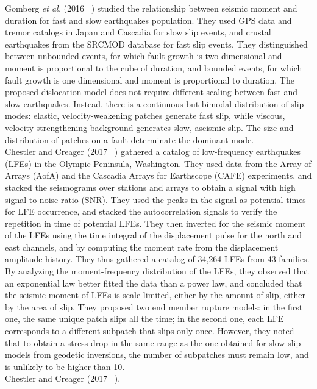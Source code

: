 \documentclass[main.tex]{subfiles}
\begin{document}
Gomberg \textit{et al.} (2016 ~\cite{GOM_2016_GRL}) studied the relationship between seismic moment and duration for fast and slow earthquakes population. They used GPS data and tremor catalogs in Japan and Cascadia for slow slip events, and crustal earthquakes from the SRCMOD database for fast slip events. They distinguished between unbounded events, for which fault growth is two-dimensional and moment is proportional to the cube of duration, and bounded events, for which fault growth is one dimensional and moment is proportional to duration. The proposed dislocation model does not require different scaling between fast and slow earthquakes. Instead, there is a continuous but bimodal distribution of slip modes: elastic, velocity-weakening patches generate fast slip, while viscous, velocity-strengthening background generates slow, aseismic slip. The size and distribution of patches on a fault determinate the dominant mode. \\

Chestler and Creager (2017 ~\cite{CHE_2017_JGR}) gathered a catalog of low-frequency earthquakes (LFEs) in the Olympic Peninsula, Washington. They used data from the Array of Arrays (AofA) and the Cascadia Arrays for Earthscope (CAFE) experiments, and stacked the seismograms over stations and arrays to obtain a signal with high signal-to-noise ratio (SNR). They used the peaks in the signal as potential times for LFE occurrence, and stacked the autocorrelation signals to verify the repetition in time of potential LFEs. They then inverted for the seismic moment of the LFEs using the time integral of the displacement pulse for the north and east channels, and by computing the moment rate from the displacement amplitude history. They thus gathered a catalog of 34,264 LFEs from 43 families. By analyzing the moment-frequency distribution of the LFEs, they observed that an exponential law better fitted the data than a power law, and concluded that the seismic moment of LFEs is scale-limited, either by the amount of slip, either by the area of slip. They proposed two end member rupture models: in the first one, the same unique patch slips all the time; in the second one, each LFE corresponds to a different subpatch that slips only once. However, they noted that to obtain a stress drop in the same range as the one obtained for slow slip models from geodetic inversions, the number of subpatches must remain low, and is unlikely to be higher than 10. \\

Chestler and Creager (2017 ~\cite{CHE_2017_G3}). \\
\end{document}
